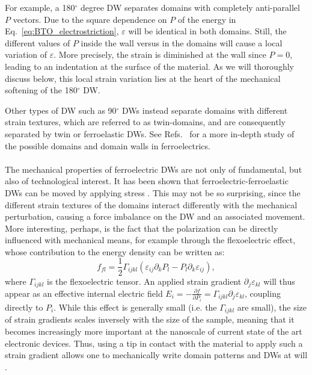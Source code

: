 For example, a 180$^\circ$ degree DW separates domains with completely anti-parallel $P$ vectors.
Due to the square dependence on $P$ of the energy in Eq.~\eqref{eq:BTO_electrostriction}, $\varepsilon$ will be identical in both domains. Still, the different values of $P$ inside the wall versus in the domains will cause a local variation of $\varepsilon$. More precisely, the strain is diminished at the wall since $P=0$, leading to an indentation at the surface of the material.
As we will thoroughly discuss below, this local strain variation lies at the heart of the mechanical softening of the 180$^\circ$ DW.

Other types of DW such as 90$^\circ$ DWs instead separate domains with different strain textures, which are referred to as twin-domains, and are consequently separated by twin or ferroelastic DWs.
See Refs.~\cite{Cao1991,Hu1998,Marton2010} for a more in-depth study of the possible domains and domain walls in ferroelectrics.
\\\\
The mechanical properties of ferroelectric DWs are not only of fundamental, but also of technological interest.
It has been shown that ferroelectric-ferroelastic DWs can be moved by applying stress \cite{Schneider2001}.
This may not be so surprising, since the different strain textures of the domains interact differently with the mechanical perturbation, causing a force imbalance on the DW and an associated movement.
More interesting, perhaps, is the fact that the polarization can be directly influenced with mechanical means, for example through the flexoelectric effect, whose contribution to the energy density can be written as:
\begin{equation}
	\label{eq:BTO_flexoelectricity}
	f_{fl} = \frac{1}{2}\Gamma_{ijkl}(\varepsilon_{ij}\partial_kP_l-P_l\partial_k\varepsilon_{ij}),
\end{equation}
where $\Gamma_{ijkl}$ is the flexoelectric tensor.
An applied strain gradient $\partial_j\varepsilon_{kl}$ will thus appear as an effective internal electric field $E_{i} = -\frac{\partial f}{\partial P_i} = \Gamma_{ijkl}\partial_j\varepsilon_{kl}$, coupling directly to $P_i$.
While this effect is generally small (i.e. the $\Gamma_{ijkl}$ are small), the size of strain gradients scales inversely with the size of the sample, meaning that it becomes increasingly more important at the nanoscale of current state of the art electronic devices.
Thus, using a tip in contact with the material to apply such a strain gradient allows one to mechanically write domain patterns and DWs at will \cite{Lu2012,Abdollahi2015, Cordero-Edwards2017,Cordero-Edwards2019}.
